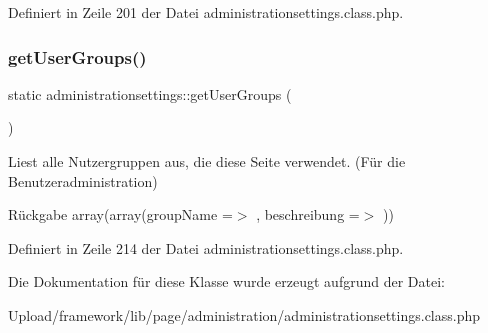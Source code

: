 Definiert in Zeile 201 der Datei administrationsettings.\+class.\+php.

\mbox{\label{classadministrationsettings_ac77f0d334382272f859a85a6f19c6353}} 
\subsubsection{\texorpdfstring{get\+User\+Groups()}{getUserGroups()}}
{\footnotesize\ttfamily static administrationsettings\+::get\+User\+Groups (\begin{DoxyParamCaption}{ }\end{DoxyParamCaption})\hspace{0.3cm}{\ttfamily [static]}}

Liest alle Nutzergruppen aus, die diese Seite verwendet. (Für die Benutzeradministration) \begin{DoxyReturn}{Rückgabe}
array(array(\textquotesingle{}group\+Name\textquotesingle{} =$>$ \textquotesingle{}\textquotesingle{}, \textquotesingle{}beschreibung\textquotesingle{} =$>$ \textquotesingle{}\textquotesingle{})) 
\end{DoxyReturn}


Definiert in Zeile 214 der Datei administrationsettings.\+class.\+php.



Die Dokumentation für diese Klasse wurde erzeugt aufgrund der Datei\+:\begin{DoxyCompactItemize}
\item 
Upload/framework/lib/page/administration/administrationsettings.\+class.\+php\end{DoxyCompactItemize}

